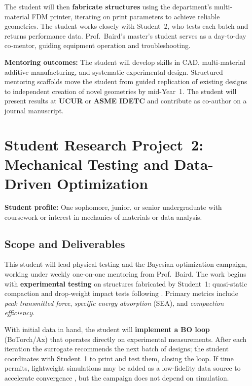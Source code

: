 \documentclass[11pt]{article}
\begin{document}
The student will then \textbf{fabricate structures} using the department's
multi-material FDM printer, iterating on print parameters
to achieve reliable geometries.
The student works closely with Student~2, who tests each
batch and returns performance data.
Prof.~Baird's master's student serves as a day-to-day co-mentor,
guiding equipment operation and troubleshooting.

\textbf{Mentoring outcomes:} The student will develop skills in CAD,
multi-material additive manufacturing, and systematic experimental design.
Structured mentoring scaffolds move the student from guided replication of
existing designs to independent creation of novel geometries by mid-Year~1.
The student will present results at \textbf{UCUR} or \textbf{ASME IDETC} and
contribute as co-author on a journal manuscript.

\section{Student Research Project~2: Mechanical Testing and Data-Driven Optimization}

\textbf{Student profile:} One sophomore, junior, or senior undergraduate with
coursework or interest in mechanics of materials or data analysis.

\subsection*{Scope and Deliverables}

This student will lead physical testing and the Bayesian optimization
campaign, working under weekly one-on-one mentoring from Prof.~Baird.  The work
begins with \textbf{experimental testing} on structures fabricated by
Student~1: quasi-static compaction and drop-weight impact tests following
\citet{pajunen2019design}.  Primary metrics include \emph{peak transmitted
force}, \emph{specific energy absorption} (SEA), and \emph{compaction
efficiency}.

With initial data in hand, the student will \textbf{implement a BO loop}
(BoTorch/Ax) that operates directly
on experimental measurements.  After each iteration the surrogate recommends
the next batch of designs; the student coordinates with Student~1 to print and
test them, closing the loop.  If time permits,
lightweight simulations may be added as a low-fidelity data
source to accelerate convergence \citep{mo2023accelerated}, but the campaign
does not depend on simulation.
\end{document}
